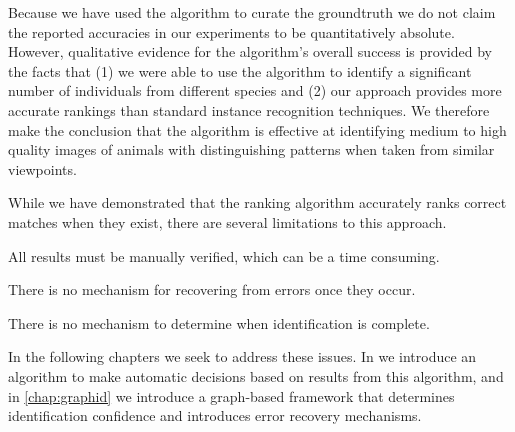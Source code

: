     Because we have used the algorithm to curate the groundtruth we do not claim the reported accuracies in our
      experiments to be quantitatively absolute.
    However, qualitative evidence for the algorithm's overall success is provided by the facts that
    (1) we were able to use the algorithm to identify a significant number of individuals from different species
      and
    (2) our approach provides more accurate rankings than standard instance recognition techniques.
    We therefore make the conclusion that the algorithm is effective at identifying medium to high quality images
      of animals with distinguishing patterns when taken from similar viewpoints.

    While we have demonstrated that the ranking algorithm accurately ranks correct matches when they exist, there
      are several limitations to this approach.
    \begin{enumln}
        \item All results must be manually verified, which can be a time consuming.
        \item There is no mechanism for recovering from errors once they occur.
        \item There is no mechanism to determine when identification is complete.
    \end{enumln}
    In the following chapters we seek to address these issues.
    In  we introduce an algorithm to make automatic decisions based on results from this
      algorithm, and in \cref{chap:graphid} we introduce a graph-based framework that determines identification
      confidence and introduces error recovery mechanisms.



